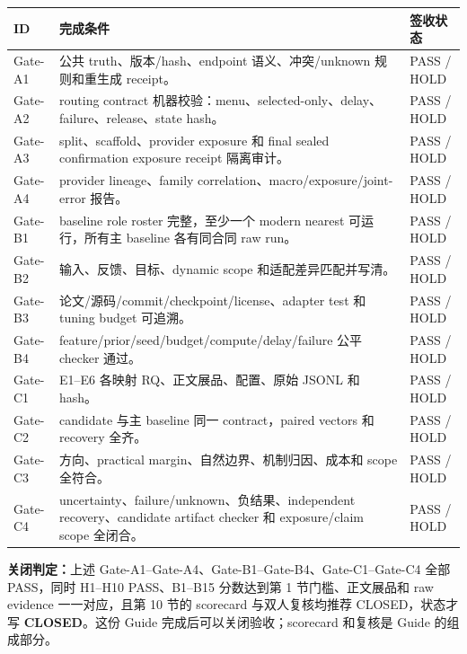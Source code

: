 \documentclass[10pt,letterpaper]{article}
\newcommand{\sect}[1]{\vspace{4pt}{\large\bfseries\color{GuideBlue}#1}\par\vspace{2pt}}
\newenvironment{clean}{\begin{center}\fontsize{8.55}{10.05}\selectfont\setlength{\tabcolsep}{3.7pt}\renewcommand{\arraystretch}{1.04}}{\end{center}}
\begin{document}
\sect{11. 完成后逐项签收}
\begin{clean}
\begin{tabular}{@{}p{.08\linewidth}p{.56\linewidth}p{.24\linewidth}@{}}
\toprule
ID & 完成条件 & 签收状态\\
\midrule
Gate-A1 & 公共 truth、版本/hash、endpoint 语义、冲突/unknown 规则和重生成 receipt。 & PASS / HOLD\\
Gate-A2 & routing contract 机器校验：menu、selected-only、delay、failure、release、state hash。 & PASS / HOLD\\
Gate-A3 & split、scaffold、provider exposure 和 final sealed confirmation exposure receipt 隔离审计。 & PASS / HOLD\\
Gate-A4 & provider lineage、family correlation、macro/exposure/joint-error 报告。 & PASS / HOLD\\
Gate-B1 & baseline role roster 完整，至少一个 modern nearest 可运行，所有主 baseline 各有同合同 raw run。 & PASS / HOLD\\
Gate-B2 & 输入、反馈、目标、dynamic scope 和适配差异匹配并写清。 & PASS / HOLD\\
Gate-B3 & 论文/源码/commit/checkpoint/license、adapter test 和 tuning budget 可追溯。 & PASS / HOLD\\
Gate-B4 & feature/prior/seed/budget/compute/delay/failure 公平 checker 通过。 & PASS / HOLD\\
Gate-C1 & E1--E6 各映射 RQ、正文展品、配置、原始 JSONL 和 hash。 & PASS / HOLD\\
Gate-C2 & candidate 与主 baseline 同一 contract，paired vectors 和 recovery 全齐。 & PASS / HOLD\\
Gate-C3 & 方向、practical margin、自然边界、机制归因、成本和 scope 全符合。 & PASS / HOLD\\
Gate-C4 & uncertainty、failure/unknown、负结果、independent recovery、candidate artifact checker 和 exposure/claim scope 全闭合。 & PASS / HOLD\\
\bottomrule
\end{tabular}
\end{clean}
\textbf{关闭判定：}上述 Gate-A1--Gate-A4、Gate-B1--Gate-B4、Gate-C1--Gate-C4 全部 PASS，同时 H1--H10 PASS、B1--B15 分数达到第 1 节门槛、正文展品和 raw evidence 一一对应，且第 10 节的 scorecard 与双人复核均推荐 CLOSED，状态才写 \textbf{CLOSED}。这份 Guide 完成后可以关闭验收；scorecard 和复核是 Guide 的组成部分。
\end{document}

